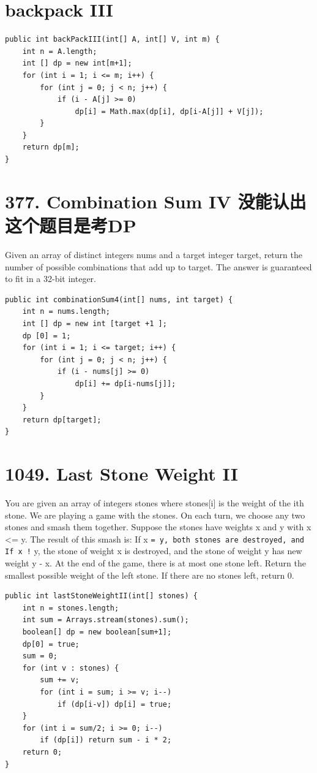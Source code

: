 \documentclass[9pt, b5paaper]{book}
\begin{document}
\section{backpack III}
\label{sec-1-25}
\begin{verbatim}
public int backPackIII(int[] A, int[] V, int m) {
    int n = A.length;
    int [] dp = new int[m+1];
    for (int i = 1; i <= m; i++) {
        for (int j = 0; j < n; j++) {
            if (i - A[j] >= 0)
                dp[i] = Math.max(dp[i], dp[i-A[j]] + V[j]);
        }
    }
    return dp[m];
}
\end{verbatim}

\section{377. Combination Sum IV 没能认出这个题目是考DP}
\label{sec-1-26}
Given an array of distinct integers nums and a target integer target, return the number of possible combinations that add up to target.
The answer is guaranteed to fit in a 32-bit integer.
\begin{verbatim}
public int combinationSum4(int[] nums, int target) {
    int n = nums.length;
    int [] dp = new int [target +1 ];
    dp [0] = 1;
    for (int i = 1; i <= target; i++) {
        for (int j = 0; j < n; j++) {
            if (i - nums[j] >= 0)
                dp[i] += dp[i-nums[j]];
        }
    }
    return dp[target];
}
\end{verbatim}

\section{1049. Last Stone Weight II}
\label{sec-1-27}
You are given an array of integers stones where stones[i] is the weight of the ith stone.
We are playing a game with the stones. On each turn, we choose any two stones and smash them together. Suppose the stones have weights x and y with x <= y. The result of this smash is:
If x \texttt{= y, both stones are destroyed, and
If x !} y, the stone of weight x is destroyed, and the stone of weight y has new weight y - x.
At the end of the game, there is at most one stone left.
Return the smallest possible weight of the left stone. If there are no stones left, return 0.
\begin{verbatim}
public int lastStoneWeightII(int[] stones) {
    int n = stones.length;
    int sum = Arrays.stream(stones).sum();
    boolean[] dp = new boolean[sum+1];
    dp[0] = true;
    sum = 0;
    for (int v : stones) {
        sum += v;
        for (int i = sum; i >= v; i--) 
            if (dp[i-v]) dp[i] = true;
    }
    for (int i = sum/2; i >= 0; i--) 
        if (dp[i]) return sum - i * 2;
    return 0;
}
\end{verbatim}
\end{document}
